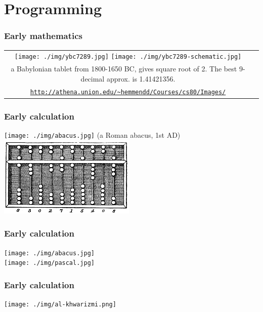 \documentclass[11pt]{beamer}
\begin{document}
\section{Programming}

\begin{frame}[fragile]
  \frametitle{Early mathematics}

  \begin{tabular}{cc}
  \texttt{[image: ./img/ybc7289.jpg]}
  \texttt{[image: ./img/ybc7289-schematic.jpg]}\\
  {\tiny a Babylonian tablet from 1800-1650 BC, gives square root of 2. The best 9-decimal approx. is 1.41421356.}\\
  \textcolor{\CSBase}{\tiny \texttt{\url{http://athena.union.edu/~hemmendd/Courses/cs80/Images/}}}
  \end{tabular}
\end{frame}


\begin{frame}[fragile]
  \frametitle{Early calculation}

  \texttt{[image: ./img/abacus.jpg]} (a Roman abacus, 1st AD)\\ \pause
  \includegraphics[height=0.35\textheight]{./img/Abacus_cn.png} \\
\end{frame}


\iffalse

\begin{frame}[fragile]
  \frametitle{Early calculation}
  \texttt{[image: ./img/abacus.jpg]} \\
  \texttt{[image: ./img/pascal.jpg]}
\end{frame}

\begin{frame}[fragile]
  \frametitle{Early calculation}

  \texttt{[image: ./img/al-khwarizmi.png]}
\end{frame}
\end{document}
